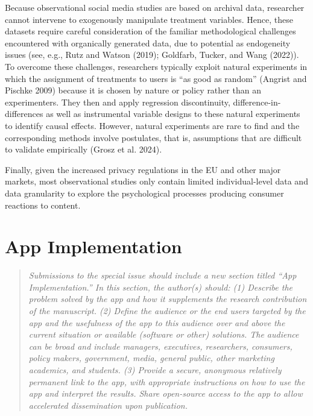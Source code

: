 \documentclass[
  a4paper,
]{scrreprt}
\begin{document}
Because observational social media studies are based on archival data,
researcher cannot intervene to exogenously manipulate treatment
variables. Hence, these datasets require careful consideration of the
familiar methodological challenges encountered with organically
generated data, due to potential as endogeneity issues (see, e.g., Rutz
and Watson (2019); Goldfarb, Tucker, and Wang (2022)). To overcome these
challenges, researchers typically exploit natural experiments in which
the assignment of treatments to users is ``as good as random'' (Angrist
and Pischke 2009) because it is chosen by nature or policy rather than
an experimenters. They then and apply regression discontinuity,
difference-in-differences as well as instrumental variable designs to
these natural experiments to identify causal effects. However, natural
experiments are rare to find and the corresponding methods involve
postulates, that is, assumptions that are difficult to validate
empirically (Grosz et al. 2024).

Finally, given the increased privacy regulations in the EU and other
major markets, most observational studies only contain limited
individual-level data and data granularity to explore the psychological
processes producing consumer reactions to content.

\hypertarget{app-implementation}{%
\section{App Implementation}\label{app-implementation}}

\begin{quote}
\emph{Submissions to the special issue should include a new section
titled ``App Implementation.'' In this section, the author(s) should:
(1) Describe the problem solved by the app and how it supplements the
research contribution of the manuscript. (2) Define the audience or the
end users targeted by the app and the usefulness of the app to this
audience over and above the current situation or available (software or
other) solutions. The audience can be broad and include managers,
executives, researchers, consumers, policy makers, government, media,
general public, other marketing academics, and students. (3) Provide a
secure, anonymous relatively permanent link to the app, with appropriate
instructions on how to use the app and interpret the results. Share
open-source access to the app to allow accelerated dissemination upon
publication.}
\end{quote}
\end{document}
